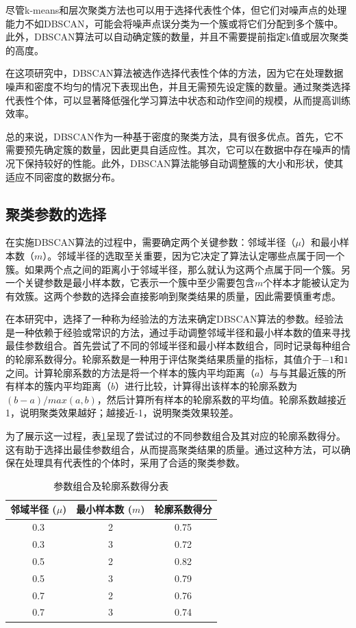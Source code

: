 尽管k-means和层次聚类方法也可以用于选择代表性个体，但它们对噪声点的处理能力不如DBSCAN，可能会将噪声点误分类为一个簇或将它们分配到多个簇中。此外，DBSCAN算法可以自动确定簇的数量，并且不需要提前指定k值或层次聚类的高度。

在这项研究中，DBSCAN算法被选作选择代表性个体的方法，因为它在处理数据噪声和密度不均匀的情况下表现出色，并且无需预先设定簇的数量。通过聚类选择代表性个体，可以显著降低强化学习算法中状态和动作空间的规模，从而提高训练效率。

总的来说，DBSCAN作为一种基于密度的聚类方法，具有很多优点。首先，它不需要预先确定簇的数量，因此更具自适应性。其次，它可以在数据中存在噪声的情况下保持较好的性能。此外，DBSCAN算法能够自动调整簇的大小和形状，使其适应不同密度的数据分布。

\subsection{聚类参数的选择}
在实施DBSCAN算法的过程中，需要确定两个关键参数：邻域半径（$\mu$）和最小样本数（$m$）。邻域半径的选取至关重要，因为它决定了算法认定哪些点属于同一个簇。如果两个点之间的距离小于邻域半径，那么就认为这两个点属于同一个簇。另一个关键参数是最小样本数，它表示一个簇中至少需要包含$m$个样本才能被认定为有效簇。这两个参数的选择会直接影响到聚类结果的质量，因此需要慎重考虑。

在本研究中，选择了一种称为经验法的方法来确定DBSCAN算法的参数。经验法是一种依赖于经验或常识的方法，通过手动调整邻域半径和最小样本数的值来寻找最佳参数组合。首先尝试了不同的邻域半径和最小样本数组合，同时记录每种组合的轮廓系数得分。轮廓系数是一种用于评估聚类结果质量的指标，其值介于$-1$和$1$之间。计算轮廓系数的方法是将一个样本的簇内平均距离（$a$）与与其最近簇的所有样本的簇内平均距离（$b$）进行比较，计算得出该样本的轮廓系数为${(b-a)} / {max(a,b)}$，然后计算所有样本的轮廓系数的平均值。轮廓系数越接近1，说明聚类效果越好；越接近-1，说明聚类效果较差。

为了展示这一过程，表\ref{tab_cluster}呈现了尝试过的不同参数组合及其对应的轮廓系数得分。这有助于选择出最佳参数组合，从而提高聚类结果的质量。通过这种方法，可以确保在处理具有代表性的个体时，采用了合适的聚类参数。

\renewcommand{\arraystretch}{1.2} %
\begin{table}[htbp]
\centering
\caption{参数组合及轮廓系数得分表}
\label{tab_cluster}
\begin{tabular}{ccc}
\toprule
邻域半径 ($\mu$) & 最小样本数 ($m$) & 轮廓系数得分       \\
\midrule
0.3 & 2 & 0.75 \\ 
0.3 & 3 & 0.72 \\ 
0.5 & 2 & 0.82 \\ 
0.5 & 3 & 0.79 \\ 
0.7 & 2 & 0.76 \\ 
0.7 & 3 & 0.74 \\ 

\bottomrule
\end{tabular}
\end{table}

